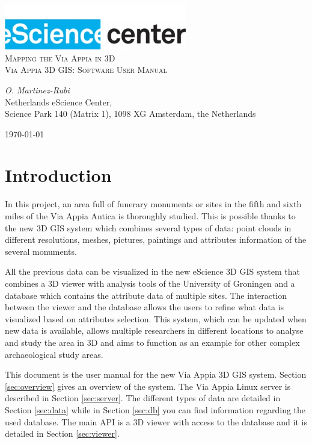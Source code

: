 \documentclass[a4paper,11pt]{article}
\begin{document}
\begin{titlepage}
\begin{center}
\includegraphics[width=0.6\textwidth]{fig/logo}\\[3cm]    
\textsc{\LARGE Mapping the Via Appia in 3D}\\[0.5cm]
\textsc{\large Via Appia 3D GIS: Software User Manual}\\[0.5cm]
\vfill
\end{center}
{\large
\emph{O. Martinez-Rubi } \\
}
{\large
{Netherlands eScience Center, \\
Science Park 140 (Matrix 1), 1098 XG Amsterdam, the Netherlands\\
}
}
\begin{center}
{\large \today}
\end{center}
\end{titlepage}

\tableofcontents

\newpage


\section{Introduction}

In this project, an area full of funerary monuments or sites in the fifth and sixth miles of the Via Appia Antica is thoroughly studied. This is possible thanks to the new 3D GIS system which combines several types of data: point clouds in different resolutions, meshes, pictures, paintings and attributes information of the several monuments.

All the previous data can be visualized in the new eScience 3D GIS system that combines a 3D viewer with analysis tools of the University of Groningen and a database which contains the attribute data of multiple sites. The interaction between the viewer and the database allows the users to refine what data is visualized based on attributes selection. This system, which can be updated when new data is available, allows multiple researchers in different locations to analyse and study the area in 3D and aims to function as an example for other complex archaeological study areas.

This document is the user manual for the new Via Appia 3D GIS system. Section \ref{sec:overview} gives an overview of the system. The Via Appia Linux server is described in Section \ref{sec:server}. The different types of data are detailed in Section \ref{sec:data} while in Section \ref{sec:db} you can find information regarding the used database. The main API is a 3D viewer with access to the database and it is detailed in Section \ref{sec:viewer}. %
\end{document}
